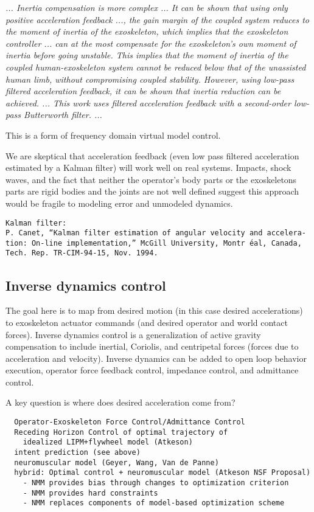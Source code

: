\documentclass[letterpaper,12pt,fullpage]{article}
\begin{document}
{\it
... Inertia compensation is more complex ...
It can be shown that using only positive acceleration
feedback ..., the gain margin of the coupled system
reduces to the moment of inertia of the exoskeleton, which
implies that the exoskeleton controller ... can at the most
compensate for the exoskeleton’s own moment of inertia
before going unstable. This implies that the moment of
inertia of the coupled human-exoskeleton system cannot be
reduced below that of the unassisted human limb, without
compromising coupled stability. However, using low-pass
filtered acceleration feedback, it can be shown that inertia 
reduction can be achieved. ...
This work uses filtered acceleration
feedback with a second-order low-pass Butterworth filter. ...
}~\cite{Nagarajan_etal_2015}

This is a form of frequency domain virtual model control.

We are skeptical that acceleration feedback (even low pass filtered acceleration
estimated by a Kalman filter) will
work well on real systems. Impacts, shock waves, and the fact that neither
the operator's body parts or the exoskeletons parts are rigid bodies and the
joints are not well defined suggest this approach would be fragile to modeling
error and unmodeled dynamics.

\begin{verbatim}
Kalman filter:
P. Canet, “Kalman filter estimation of angular velocity and accelera-
tion: On-line implementation,” McGill University, Montr ́eal, Canada,
Tech. Rep. TR-CIM-94-15, Nov. 1994.
\end{verbatim}

\subsection{Inverse dynamics control}

The goal here is to map from desired motion (in this case desired
accelerations) to exoskeleton actuator commands (and desired operator
and world contact forces).
Inverse dynamics control is a generalization of active gravity compensation to include
inertial, Coriolis, and centripetal forces (forces due to acceleration and
velocity).
Inverse dynamics can be added to open loop behavior execution, operator force
feedback control, impedance control, and admittance control.

A key question is where does desired acceleration come from?
\begin{verbatim}
  Operator-Exoskeleton Force Control/Admittance Control  
  Receding Horizon Control of optimal trajectory of 
    idealized LIPM+flywheel model (Atkeson)
  intent prediction (see above)
  neuromuscular model (Geyer, Wang, Van de Panne)
  hybrid: Optimal control + neuromuscular model (Atkeson NSF Proposal)
    - NMM provides bias through changes to optimization criterion
    - NMM provides hard constraints
    - NMM replaces components of model-based optimization scheme
\end{verbatim}
\end{document}
